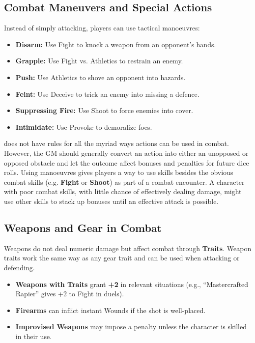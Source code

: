 \subsection{Combat Maneuvers and Special Actions}
Instead of simply attacking, players can use tactical manoeuvres:

\begin{Example}
	\begin{itemize}
    	\item \textbf{Disarm:} Use Fight to knock a weapon from an opponent’s hands.
	    \item \textbf{Grapple:} Use Fight vs. Athletics to restrain an enemy.
    	\item \textbf{Push:} Use Athletics to shove an opponent into hazards.
	    \item \textbf{Feint:} Use Deceive to trick an enemy into missing a defence.
    	\item \textbf{Suppressing Fire:} Use Shoot to force enemies into cover.
	    \item \textbf{Intimidate:} Use Provoke to demoralize foes.
	\end{itemize}
\end{Example}

\wyrd does not have rules for all the myriad ways actions can be used in combat. However, the GM should generally convert an action into either an unopposed or opposed obstacle and let the outcome affect bonuses and penalties for future dice rolls. Using manoeuvres gives players a way to use skills besides the obvious combat skills (e.g. \textbf{Fight} or \textbf{Shoot}) as part of a combat encounter. A character with poor combat skills, with little chance of effectively dealing damage, might use other skills to stack up bonuses until an effective attack is possible.

\subsection{Weapons and Gear in Combat}
Weapons do not deal numeric damage but affect combat through \textbf{Traits}. Weapon traits work the same way as any gear trait and can be used when attacking or defending.

\begin{Example}
	\begin{itemize}
    	\item \textbf{Weapons with Traits} grant \textbf{+2} in relevant situations (e.g., “Mastercrafted Rapier” gives +2 to Fight in duels).
	    \item \textbf{Firearms} can inflict instant Wounds if the shot is well-placed.
    	\item \textbf{Improvised Weapons} may impose a penalty unless the character is skilled in their use.
	\end{itemize}
\end{Example}

